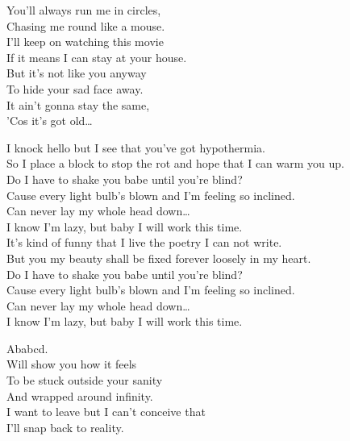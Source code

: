 You'll always run me in circles, \\
Chasing me round like a mouse. \\
I'll keep on watching this movie \\
If it means I can stay at your house. \\
But it's not like you anyway \\
To hide your sad face away. \\
It ain't gonna stay the same, \\
'Cos it's got old… \\





I knock hello but I see that you've got hypothermia. \\
So I place a block to stop the rot and hope that I can warm you up. \\
Do I have to shake you babe until you're blind? \\
Cause every light bulb's blown and I'm feeling so inclined. \\

Can never lay my whole head down… \\
I know I'm lazy, but baby I will work this time. \\

It's kind of funny that I live the poetry I can not write. \\
But you my beauty shall be fixed forever loosely in my heart. \\
Do I have to shake you babe until you're blind? \\
Cause every light bulb's blown and I'm feeling so inclined. \\

Can never lay my whole head down… \\
I know I'm lazy, but baby I will work this time. \\





Ababcd. \\
Will show you how it feels \\
To be stuck outside your sanity \\
And wrapped around infinity. \\
I want to leave but I can't conceive that \\
I'll snap back to reality. \\

